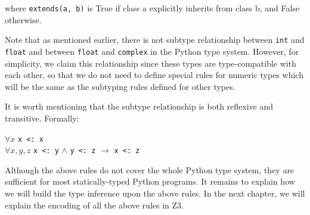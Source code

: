 where \lstinline|extends(a, b)| is True if class a explicitly inherits from class b,
and False otherwise.

Note that as mentioned earlier, there is not subtype relationship between \lstinline|int| and \lstinline|float| and between \lstinline|float| and \lstinline|complex| in the Python type system. However, for simplicity, we claim this relationship since these types are type-compatible with each other, so that we do not need to define special rules for numeric types which will be the same as the subtyping rules defined for other types.

It is worth mentioning that the subtype relationship is both reflexive and transitive. Formally:


\begin{center}
	$\forall x$ \lstinline|x <: x| \\
	$\forall x,y,z$ \lstinline|x <: y| $\land$ \lstinline|y <: z| $\rightarrow$ \lstinline|x <: z|
\end{center}

Although the above rules do not cover the whole Python type system, they are sufficient for most statically-typed Python programs. It remains to explain how we will build the type inference upon the above rules. In the next chapter, we will explain the encoding of all the above rules in Z3.
